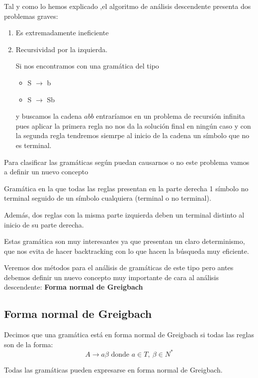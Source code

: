\documentclass{apuntes}
\begin{document}
Tal y como lo hemos explicado ,el algoritmo de análisis descendente presenta dos problemas graves:
\begin{enumerate}
\item Es extremadamente ineficiente
\item Recursividad por la izquierda.

Si nos encontramos con una gramática del tipo
\begin{itemize}
\item S $\rightarrow$ b
\item S $\rightarrow$ Sb
\end{itemize}
y buscamos la cadena $abb$ entraríamos en un problema de recursión infinita pues aplicar la primera regla no nos da la solución final en ningún caso y con la segunda regla tendremos siemrpe al inicio de la cadena un símbolo que no es terminal.
\end{enumerate}

Para clasificar las gramáticas según puedan causarnos o no este problema vamos a definir un nuevo concepto

\begin{defn}[Gramática LL(1)]
Gramática en la que todas las reglas presentan en la parte derecha 1 símbolo no terminal seguido de un símbolo cualquiera (terminal o no terminal).

Además, dos reglas con la misma parte izquierda deben un terminal distinto al inicio de su parte derecha.
\end{defn}

Estas gramática son muy interesantes ya que presentan un claro determinismo, que nos evita de hacer backtracking con lo que hacen la búsqueda muy eficiente.


Veremos dos métodos para el análisis de gramáticas de este tipo pero antes debemos definir un nuevo concepto muy importante de cara al análisis descendente: \textbf{Forma normal de Greigbach}

\subsection{Forma normal de Greigbach}

\begin{defn}
Decimos que una gramática está en forma normal de Greigbach si todas las reglas son de la forma:
\[A \rightarrow a\beta \text{ donde } a \in T, \ \beta \in N^*\]
\end{defn}

\obs Todas las gramáticas pueden expresarse en forma normal de Greigbach.
\end{document}
